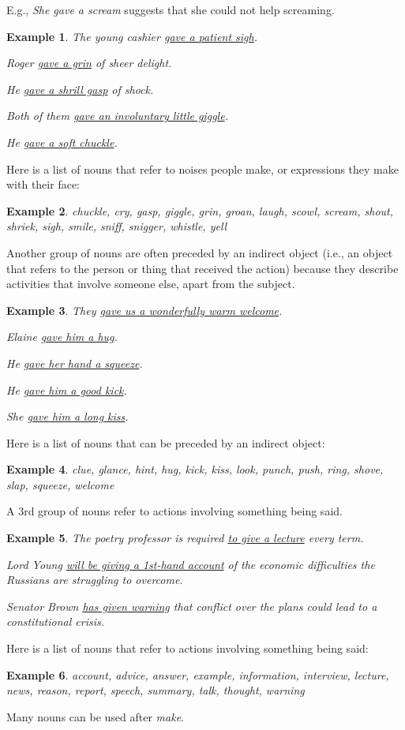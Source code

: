 \documentclass[oneside]{book}
\numberwithin{equation}{section}
\newtheorem{example}{Example}[section]
\begin{document}
E.g., \textit{She gave a scream} suggests that she could not help screaming.
\begin{example}
    The young cashier \underline{gave a patient sigh}.
    
    Roger \underline{gave a grin} of sheer delight.
    
    He \underline{gave a shrill gasp} of shock.
    
    Both of them \underline{gave an involuntary little giggle}.
    
    He \underline{gave a soft chuckle}.
\end{example} 
Here is a list of nouns that refer to noises people make, or expressions they make with their face:
\begin{example}
    chuckle, cry, gasp, giggle, grin, groan, laugh, scowl, scream, shout, shriek, sigh, smile, sniff, snigger, whistle, yell
\end{example}
Another group of nouns are often preceded by an indirect object (i.e., an object that refers to the person or thing that received the action) because they describe activities that involve someone else, apart from the subject.
\begin{example}
    They \underline{gave us a wonderfully warm welcome}.
    
    Elaine \underline{gave him a hug}.
    
    He \underline{gave her hand a squeeze}.
    
    He \underline{gave him a good kick}.
    
    She \underline{gave him a long kiss}.
\end{example}
Here is a list of nouns that can be preceded by an indirect object:
\begin{example}
    clue, glance, hint, hug, kick, kiss, look, punch, push, ring, shove, slap, squeeze, welcome
\end{example}
A 3rd group of nouns refer to actions involving something being said.
\begin{example}
    The poetry professor is required \underline{to give a lecture} every term.
    
    Lord Young \underline{will be giving a 1st-hand account} of the economic difficulties the Russians are struggling to overcome.
    
    Senator Brown \underline{has given warning} that conflict over the plans could lead to a constitutional crisis.
\end{example}
Here is a list of nouns that refer to actions involving something being said:
\begin{example}
    account, advice, answer, example, information, interview, lecture, news, reason, report, speech, summary, talk, thought, warning
\end{example}
%
\noindent{} Many nouns can be used after \textit{make}.
\end{document}
